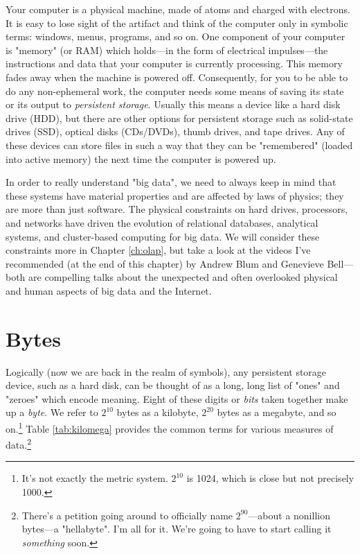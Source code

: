 \documentclass[11pt]{book}
\newcommand{\term}[1]{\emph{#1}} %
\begin{document}
Your computer is a physical machine, made of atoms and charged with electrons.  It is easy to lose sight of the artifact and think of the computer only in symbolic terms: windows, menus, programs, and so on.  One component of your computer is "memory" (or RAM) which holds---in the form of  electrical impulses---the instructions and data that your computer is currently processing.  This memory fades away when the machine is powered off.  Consequently, for you to be able to do any non-ephemeral work, the computer needs some means of saving its state or its output to \term{persistent storage}.  Usually this means a device like a hard disk drive (HDD), but there are other options for persistent storage such as solid-state drives (SSD), optical disks (CDs/DVDs), thumb drives, and tape drives.  Any of these devices can store files in such a way that they can be "remembered" (loaded into active memory) the next time the computer is powered up.

In order to really understand "big data", we need to always keep in mind that these systems have material properties and are affected by laws of physics; they are more than just software.  The physical constraints on hard drives, processors, and networks have driven the evolution of relational databases, analytical systems, and cluster-based computing for big data. We will consider these constraints more in Chapter \ref{ch:olap}, but take a look at the videos I've recommended (at the end of this chapter) by Andrew Blum and Genevieve Bell---both are compelling talks about the unexpected and often overlooked physical and human aspects of big data and the Internet.

\section{Bytes}

Logically (now we are back in the realm of symbols), any persistent storage device, such as a hard disk, can be thought of as a long, long list of "ones" and "zeroes" which encode meaning.  Eight of these digits or \term{bits} taken together make up a \term{byte}.  We refer to $2^{10}$ bytes as a kilobyte, $2^{20}$ bytes as a megabyte, and so on.\footnote{It's not exactly the metric system.  $2^{10}$ is 1024, which is close but not precisely 1000.}  Table \ref{tab:kilomega} provides the common terms for various measures of data.\footnote{There's a petition going around to officially name $2^{90}$---about a nonillion bytes---a "hellabyte".  I'm all for it.  We're going to have to start calling it \emph{something} soon.}
\end{document}
